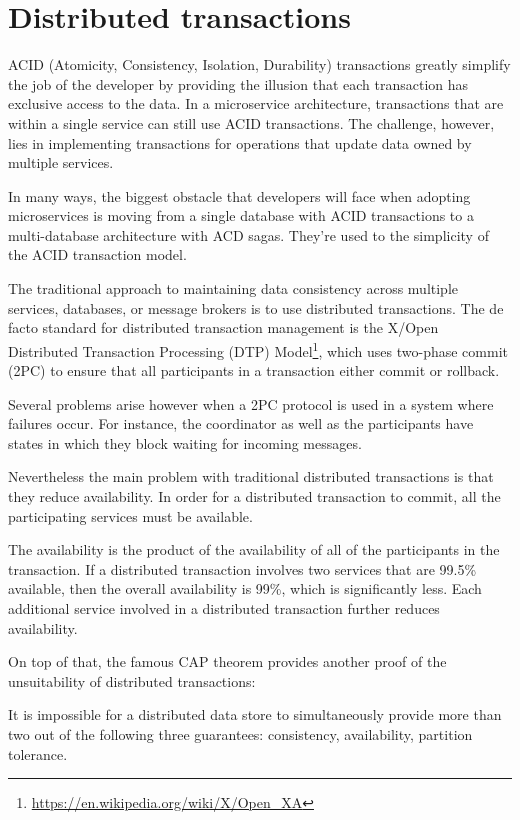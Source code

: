 \documentclass[conference]{IEEEtran}
\begin{document}
\section{Distributed transactions}

ACID (Atomicity, Consistency, Isolation, Durability) transactions greatly simplify the job of the developer by providing the illusion that each transaction has exclusive access to the data. In a microservice architecture, transactions that are within a single service can still use ACID transactions. The challenge, however, lies in implementing transactions for operations that update data owned by multiple services.

In many ways, the biggest obstacle that developers will face when adopting microservices is moving from a single database with ACID transactions to a multi-database architecture with ACD sagas. They’re used to the simplicity of the ACID transaction model. \cite{microservices-patterns}

The traditional approach to maintaining data consistency across multiple services, databases, or message brokers is to use distributed transactions. The de facto standard for distributed transaction management is the X/Open Distributed Transaction Processing (DTP) Model\footnote{\url{https://en.wikipedia.org/wiki/X/Open_XA}}, which uses two-phase commit (2PC) to ensure that all participants in a transaction either commit or rollback. 

Several problems arise however when a 2PC protocol is used in a system where failures occur. For instance, the coordinator as well as the participants have states in which they block waiting for incoming messages. \cite{distributed-systems}

Nevertheless the main problem with traditional distributed transactions is that they reduce availability. In order for a distributed transaction to commit, all the participating services must be available.

The availability is the product of the availability of all of the participants in the transaction. If a distributed transaction involves two services that are 99.5\% available, then the overall availability is 99\%, which is significantly less. Each additional service involved in a distributed transaction further reduces availability.

On top of that, the famous CAP theorem provides another proof of the unsuitability of distributed transactions:

\hfill It is impossible for a distributed data store to simultaneously provide more than two out of the following three guarantees: consistency, availability, partition tolerance.
 
\end{document}
